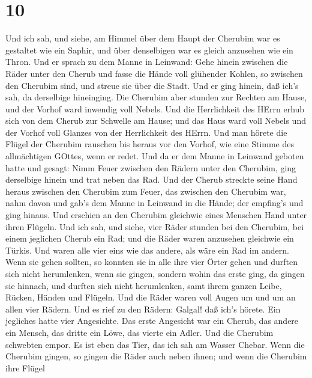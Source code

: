 \hypertarget{section-9}{%
\section{10}\label{section-9}}

 Und ich sah, und siehe, am Himmel über dem Haupt der
Cherubim war es gestaltet wie ein Saphir, und über denselbigen war es
gleich anzusehen wie ein Thron.  Und er sprach zu dem Manne
in Leinwand: Gehe hinein zwischen die Räder unter den Cherub und fasse
die Hände voll glühender Kohlen, so zwischen den Cherubim sind, und
streue sie über die Stadt. Und er ging hinein, daß ich's sah, da
derselbige hineinging.  Die Cherubim aber stunden zur
Rechten am Hause, und der Vorhof ward inwendig voll Nebels. 
Und die Herrlichkeit des HErrn erhub sich von dem Cherub zur Schwelle am
Hause; und das Haus ward voll Nebels und der Vorhof voll Glanzes von der
Herrlichkeit des HErrn.  Und man hörete die Flügel der
Cherubim rauschen bis heraus vor den Vorhof, wie eine Stimme des
allmächtigen GOttes, wenn er redet.  Und da er dem Manne in
Leinwand geboten hatte und gesagt: Nimm Feuer zwischen den Rädern unter
den Cherubim, ging derselbige hinein und trat neben das Rad.
 Und der Cherub streckte seine Hand heraus zwischen den
Cherubim zum Feuer, das zwischen den Cherubim war, nahm davon und gab's
dem Manne in Leinwand in die Hände; der empfing's und ging hinaus.
 Und erschien an den Cherubim gleichwie eines Menschen Hand
unter ihren Flügeln.  Und ich sah, und siehe, vier Räder
stunden bei den Cherubim, bei einem jeglichen Cherub ein Rad; und die
Räder waren anzusehen gleichwie ein Türkis.  Und waren alle
vier eins wie das andere, als wäre ein Rad im andern.  Wenn
sie gehen sollten, so konnten sie in alle ihre vier Örter gehen und
durften sich nicht herumlenken, wenn sie gingen, sondern wohin das erste
ging, da gingen sie hinnach, und durften sich nicht herumlenken,
 samt ihrem ganzen Leibe, Rücken, Händen und Flügeln. Und
die Räder waren voll Augen um und um an allen vier Rädern. 
Und es rief zu den Rädern: Galgal! daß ich's hörete.  Ein
jegliches hatte vier Angesichte. Das erste Angesicht war ein Cherub, das
andere ein Mensch, das dritte ein Löwe, das vierte ein Adler.
 Und die Cherubim schwebten empor. Es ist eben das Tier,
das ich sah am Wasser Chebar.  Wenn die Cherubim gingen, so
gingen die Räder auch neben ihnen; und wenn die Cherubim ihre Flügel
